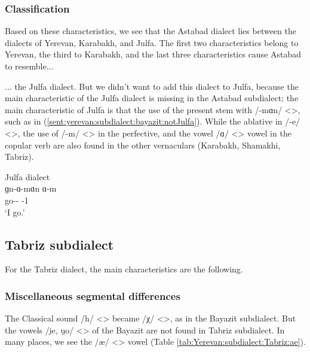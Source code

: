 \subsubsection{Classification}

Based on these characteristics, we see that the Astabad dialect lies between the dialects of Yerevan, Karabakh, and Julfa. The first two characteristics belong to Yerevan, the third to Karabakh, and the last three characteristics cause Astabad to resemble... 
\begin{adjarianpage}\label{page:46}\end{adjarianpage}%

... the Julfa dialect. But we didn't want to add this dialect to Julfa, because the main characteristic of the Julfa dialect is missing in the Astabad subdialect; the main characteristic of Julfa is that the use of the present stem with /-mɑn/ <>, such as in (\ref{sent:yerevan:subdialect:bayazit:notJulfa}). While the ablative in /-e/ <>, the use of /-m/ <> in the perfective, and the vowel /ɑ/ <> vowel in the copular verb are also found in the other vernaculars (Karabakh, Shamakhi, Tabriz). 


\begin{exe}
	\ex Julfa dialect\\ \gll
	ɡn-ɑ-mɑn ɑ-m \\
	go-{\thgloss}-{\impfcvb} {\aux}-1{\sg} \\
	\trans `I go.'\label{sent:yerevan:subdialect:bayazit:notJulfa} \\
	
\end{exe}


\subsection{Tabriz subdialect}


For the Tabriz dialect, the main characteristics are the following. 


\subsubsection{Miscellaneous segmental differences} 

The Classical sound /h/ <> became /χ/ <>, as in the Bayazit subdialect. But the vowels /i̯e, u̯o/ <> of the Bayazit are not found in Tabriz subdialect. In many places, we see the /æ/ <> vowel (Table \ref{tab:Yerevan:subdialect:Tabriz:ae}). 





